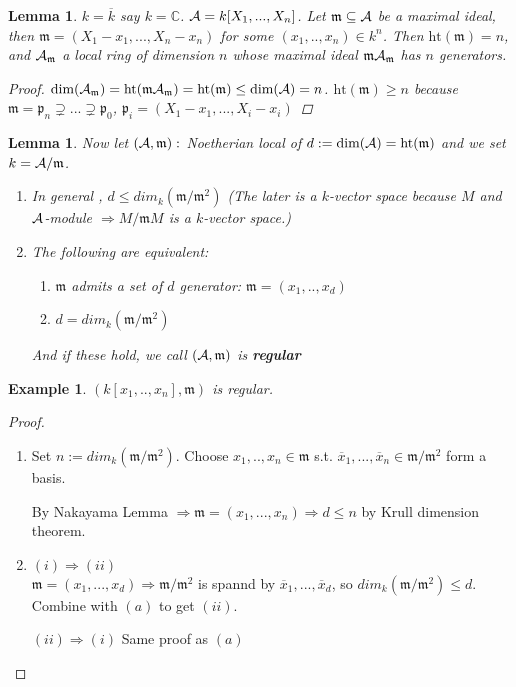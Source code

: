 \documentclass[11pt]{article}
\newtheorem{lemma}[thm]{Lemma}
\newtheorem{ex}[thm]{Example}
\newcommand{\cplx}{\mathbb C}
\newcommand{\scm}{{\mathfrak m}}
\newcommand{\scp}{{\mathfrak p}}
\newcommand{\cala}{{\cal A}}
\newcommand{\Lrta}{\Longrightarrow}
\begin{document}
\begin{lemma}
$k=\overline{k}$ say $k=\cplx$. $\cala=k[X_1,...,X_n]$. Let $\scm\subseteq \cala$ be a maximal ideal, then $\scm=(X_1-x_1,...,X_n-x_n)$ for some $(x_1,..,x_n)\in k^n$. Then $\text{ht}(\scm)=n$, and $\cala_\scm$ a local ring of dimension $n$ whose maximal ideal $\scm\cala_\scm$ has $n$ generators.
\begin{proof}
$\text{dim}(\cala_\scm)=\text{ht}(\scm\cala_\scm)=\text{ht}(\scm)\leq \text{dim}(\cala)=n$. $\text{ht}(\scm)\geq n$ because $\scm=\scp_n\supsetneq ...\supsetneq \scp_0$, $\scp_i=(X_1-x_1,...,X_i-x_i)$ 
\end{proof}
\end{lemma}


\begin{lemma}Now let $(\cala,\scm):$ Noetherian local of $d:=\text{dim}(\cala)=\text{ht}(\scm)$ and we set $k=\cala/\scm$.

\begin{enumerate}[label=(\alph*)]
\item In general , $d\leq dim_k(\scm/\scm^2)$ (The later is a $k$-vector space because $M$ and $\cala$-module $\Lrta M/\scm M$ is a $k$-vector space.)
\item The following are equivalent:
    \begin{enumerate}[label=(\roman*)]
        \item $\scm$ admits a set of $d$ generator: $\scm=(x_1,..,x_d)$
        \item $d=dim_k(\scm/\scm^2)$
    \end{enumerate}
    And if these hold, we call $(\cala,\scm)$ is \textbf{regular}
\end{enumerate}
\end{lemma}
\begin{ex}
$(k[x_1,..,x_n],\scm)$ is regular.
\end{ex}
\begin{proof}\ 
\begin{enumerate}[label=(\alph*)]
\item Set $n:=dim_k(\scm/\scm^2)$. Choose $x_1,..,x_n\in\scm$ s.t. $\overline{x}_1,...,\overline{x}_n\in \scm/\scm^2$ form a basis.

By Nakayama Lemma $\Lrta\scm=(x_1,...,x_n)\Lrta d\leq n$ by Krull dimension theorem.

\item $(i)\Lrta (ii)$\\
$\scm=(x_1,...,x_d)\Lrta \scm/\scm^2 $ is spannd by $\overline{x}_1,...,\overline{x}_d$, so $dim_k(\scm/\scm^2)\leq d$. Combine with $(a)$ to get $(ii)$.

$(ii)\Lrta (i)$ Same proof as $(a)$

\end{enumerate}
\end{proof}
\end{document}
